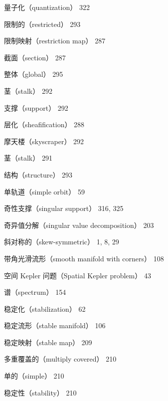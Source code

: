 {\noindent\hspace*{1.5em}量子化（quantization） 322\par
\noindent\hspace*{1.5em}限制的（restricted） 293\par
\noindent\hspace*{1.5em}限制映射（restriction map） 287\par
\noindent\hspace*{1.5em}截面（section） 287\par
\noindent\hspace*{3em}整体（global） 295\par
\noindent\hspace*{3em}茎（stalk） 292\par
\noindent\hspace*{3em}支撑（support） 292\par
\noindent\hspace*{1.5em}层化（sheafification） 288\par
\noindent\hspace*{1.5em}摩天楼（skyscraper） 292\par
\noindent\hspace*{1.5em}茎（stalk） 291\par
\noindent\hspace*{1.5em}结构（structure） 293\par
\noindent 单轨道（simple orbit） 59\par
\noindent 奇性支撑（singular support） 316, 325\par
\noindent 奇异值分解（singular value decomposition） 203\par
\noindent 斜对称的（skew-symmetric） 1, 8, 29\par
\noindent 带角光滑流形（smooth manifold with corners） 108\par
\noindent 空间 Kepler 问题（Spatial Kepler problem） 43\par
\noindent 谱（spectrum） 154\par
\noindent 稳定化（stabilization） 62\par
\noindent 稳定流形（stable manifold） 106\par
\noindent 稳定映射（stable map） 209\par
\noindent\hspace*{1.5em}多重覆盖的（multiply covered） 210\par
\noindent\hspace*{1.5em}单的（simple） 210\par
\noindent\hspace*{1.5em}稳定性（stability） 210\par
}
